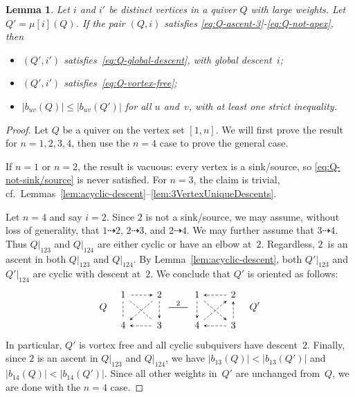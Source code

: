 \documentclass[11pt, letterpaper]{amsart}
\newtheorem{lemma}[theorem]{Lemma}
\theoremstyle{definition}
\numberwithin{equation}{section}
\newcommand{\T}[2]{\mu[#1](#2)} %
\newcommand{\mutation}[1]{\stackrel{#1}{\rule[.5ex]{2em}{0.5pt}}}
\newcommand{\points}{\!\dasharrow\!}
\begin{document}
\begin{lemma}
\label{lem:StrictAscents}
Let $i$ and $i'$ be distinct vertices in a quiver $Q$ with large weights.
Let~$Q'\!=\!\T{i}{Q}$. 
If the pair $(Q,i)$ satisfies  \eqref{eq:Q-ascent-3}-\eqref{eq:Q-not-apex}, then 
\begin{itemize}[leftmargin=.2in]
\item 
$(Q',i')$ satisfies~\eqref{eq:Q-global-descent}, with global descent~$i$; 
\item
$(Q',i')$ satisfies~\eqref{eq:Q-vortex-free}; 
\item
$|b_{uv}(Q)| \leq |b_{uv}(Q')|$ for all $u$ and~$v$, with at least one strict inequality.
\end{itemize}
\end{lemma}

\begin{proof}
Let $Q$ be a quiver on the vertex set $[1,n]$. 
We will first prove the result for $n=1, 2, 3, 4$, then use the $n=4$ case to prove the general case.

If $n=1$ or $n=2$, the result is vacuous: every vertex is a sink/source, so \eqref{eq:Q-not-sink/source} is never satisfied.  
For $n=3$, the claim is trivial, cf.\ Lemmas~\ref{lem:acyclic-descent}--\ref{lem:3VertexUniqueDescents}. 

Let $n=4$ and say $i=2$. 
Since $2$ is not a sink/source, we may assume, without loss of generality, that $1\points 2$, $2\points 3$, and $2\points 4$. 
We may further assume that $3\points 4$. 
Thus $Q|_{123}$ and $Q|_{124}$ are either cyclic or have an elbow at~$2$. 
Regardless, $2$~is an ascent in both $Q|_{123}$ and $Q|_{124}$. 
By Lemma~\ref{lem:acyclic-descent}, both $Q'|_{123}$ and $Q'|_{124}$ are cyclic with descent at~$2$.
We conclude that $Q'$ is oriented as follows: 
\begin{equation*}
Q \quad \begin{tikzcd}[arrows={stealth-, dashed}, sep=normal, ampersand replacement=\&]
  1 \arrow[d, -] \arrow[dr, -]
  \& 2 \arrow[l]
  \\
   4 \arrow[ur] \arrow[r] \& 3 \arrow[u] 
\end{tikzcd}
\mutation{2}
\begin{tikzcd}[arrows={-stealth, dashed}, sep=normal, ampersand replacement=\&]
  1 \arrow[d] \arrow[dr]
  \& 2 \arrow[l]
  \\
   4 \arrow[ur] \& 3 \arrow[u] \arrow[l]
\end{tikzcd}
\quad
Q'
\end{equation*}
In particular, $Q'$ is vortex free and all cyclic subquivers have descent~$2$. 
Finally, since $2$ is an ascent in $Q|_{123}$ and $Q|_{124}$, 
we have $|b_{13}(Q)| < |b_{13}(Q')|$ and $|b_{14}(Q)| < |b_{14}(Q')|$. 
Since all other weights in~$Q'$ are unchanged from~$Q$, we are done with the $n=4$ case.


\end{proof}
\end{document}
